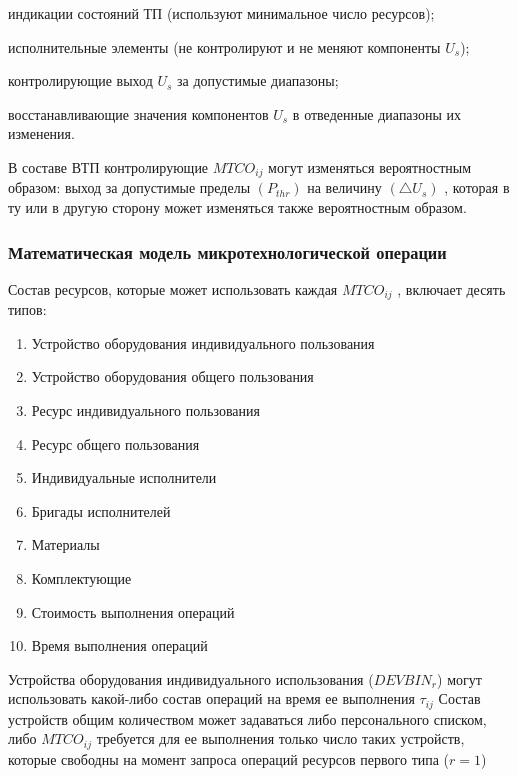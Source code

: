 \begin{textitemize}
    \item индикации состояний ТП (используют минимальное число ресурсов);
    \item исполнительные элементы (не контролируют и не меняют компоненты ${U_s}$);
    \item контролирующие выход $U_s$ за допустимые диапазоны;
    \item восстанавливающие значения компонентов $U_s$ в отведенные диапазоны их изменения.
\end{textitemize}

В составе ВТП контролирующие $MTCO_{ij}$ могут изменяться вероятностным образом: выход за допустимые пределы $( P_{thr})$ на величину $( \triangle U_s)$ , которая в ту или в другую сторону может изменяться также вероятностным образом.


\subsubsection{Математическая модель микротехнологической операции}

Состав ресурсов, которые может использовать каждая $MTCO_{ij}$ , включает десять типов:
\begin{enumerate}
    \item Устройство оборудования индивидуального пользования
    \item Устройство оборудования общего пользования
    \item Ресурс индивидуального пользования
    \item Ресурс общего пользования
    \item Индивидуальные исполнители
    \item Бригады исполнителей
    \item Материалы
    \item Комплектующие
    \item Стоимость выполнения операций
    \item Время  выполнения операций
\end{enumerate}

Устройства оборудования индивидуального использования ($DEVBIN_r$) могут использовать какой-либо состав операций  на время ее выполнения  $\tau_{ij}$ Состав устройств общим количеством   может задаваться либо  персонального списком, либо  $MTCO_{ij}$ требуется для ее выполнения только число таких устройств, которые свободны на момент запроса операций ресурсов первого типа ($r=1$)

